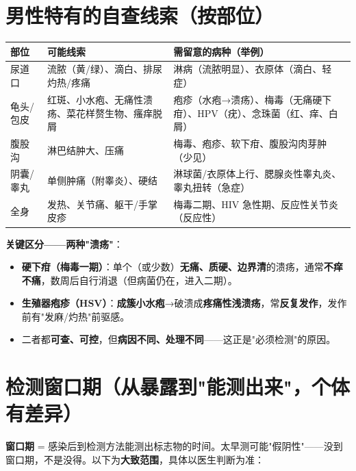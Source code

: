 \documentclass[12pt,UTF8,openany]{ctexbook}
\begin{document}
\section{男性特有的自查线索（按部位）}

\begin{tabularx}{\textwidth}{l X X}
\toprule
\textbf{部位} & \textbf{可能线索} & \textbf{需留意的病种（举例）} \\
\midrule
尿道口 & 流脓（黄/绿）、滴白、排尿灼热/疼痛 & 淋病（流脓明显）、衣原体（滴白、轻症） \\
龟头/包皮 & 红斑、小水疱、无痛性溃疡、菜花样赘生物、瘙痒脱屑 & 疱疹（水疱→溃疡）、梅毒（无痛硬下疳）、HPV（疣）、念珠菌（红、痒、白屑） \\
腹股沟 & 淋巴结肿大、压痛 & 梅毒、疱疹、软下疳、腹股沟肉芽肿（少见） \\
阴囊/睾丸 & 单侧肿痛（附睾炎）、硬结 & 淋球菌/衣原体上行、腮腺炎性睾丸炎、睾丸扭转（急症） \\
全身 & 发热、关节痛、躯干/手掌皮疹 & 梅毒二期、HIV 急性期、反应性关节炎（反应性） \\
\bottomrule
\end{tabularx}

\noindent\textbf{关键区分——两种"溃疡"}：
\begin{itemize}[leftmargin=2em,itemsep=0.3em]
  \item \textbf{硬下疳（梅毒一期）}：单个（或少数）\textbf{无痛、质硬、边界清}的溃疡，通常\textbf{不痒不痛}，数周后自行消退（但病菌仍在，进入二期）。
  \item \textbf{生殖器疱疹（HSV）}：\textbf{成簇小水疱}→破溃成\textbf{疼痛性浅溃疡}，常\textbf{反复发作}，发作前有"发麻/灼热"前驱感。
  \item 二者都\textbf{可查、可控}，但\textbf{病因不同、处理不同}——这正是"必须检测"的原因。
\end{itemize}

\section{检测窗口期（从暴露到"能测出来"，个体有差异）}

\textbf{窗口期} = 感染后到检测方法能测出标志物的时间。太早测可能"假阴性"——没到窗口期，不是没得。以下为\textbf{大致范围}，具体以医生判断为准：
\end{document}
